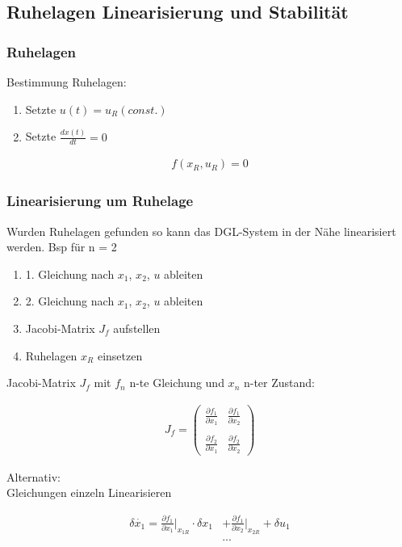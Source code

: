 \documentclass[10pt,a4paper]{article}
\begin{document}
\subsection{Ruhelagen Linearisierung und Stabilität}

\subsubsection{Ruhelagen}
Bestimmung Ruhelagen:
\begin{enumerate}
    \item Setzte $u(t) = u_R (const.)$
    \item Setzte $\frac{dx(t)}{dt} = 0$
\end{enumerate}

  \begin{mdframed}[style=exercise]
    \begin{align}
        f(x_R, u_R) = 0
    \end{align}
  \end{mdframed}

\subsubsection{Linearisierung um Ruhelage}
Wurden Ruhelagen gefunden so kann das DGL-System in der
Nähe linearisiert werden.
Bsp für n = 2
\begin{enumerate}
    \item 1. Gleichung nach $x_1$, $x_2$, $u$ ableiten
    \item 2. Gleichung nach $x_1$, $x_2$, $u$ ableiten
    \item Jacobi-Matrix $J_f$ aufstellen 
    \item Ruhelagen $x_R$ einsetzen
\end{enumerate}
Jacobi-Matrix $J_f$ mit $f_n$ n-te Gleichung und $x_n$ n-ter Zustand:
  \begin{mdframed}[style=exercise]
    \begin{align}
        J_f = 
        \begin{pmatrix}
            \frac{\partial f_1}{\partial x_1} & \frac{\partial f_1}{\partial x_2} \\ \\
            \frac{\partial f_2}{\partial x_1} & \frac{\partial f_2}{\partial x_2} 
        \end{pmatrix} 
    \end{align}
  \end{mdframed}
Alternativ: \\
Gleichungen einzeln Linearisieren
  \begin{mdframed}[style=exercise]
    \begin{align}
        \delta \dot{x_1} = \frac{\partial f_1}{\partial x_1} \big|_{x_{1R}} \cdot \delta x_1
        &+ \frac{\partial f_1}{\partial x_2} \big|_{x_{2R}} + \delta u_1 \\
        &...
    \end{align}
  \end{mdframed}
\end{document}
